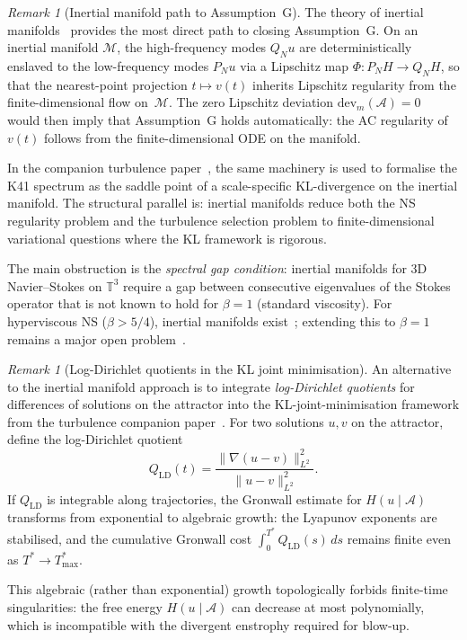 \documentclass[12pt,a4paper]{article}
\theoremstyle{definition}
\theoremstyle{plain}
\theoremstyle{remark}
\newtheorem{remark}[definition]{Remark}
\begin{document}
\begin{remark}[Inertial manifold path to Assumption~G]
\label{rem:inertial-manifold-path}
The theory of inertial manifolds~\cite{FoiasSellTemam88} provides the most
direct path to closing Assumption~G\@. On an inertial manifold
$\mathcal{M}$, the high-frequency modes $Q_N u$ are deterministically
enslaved to the low-frequency modes $P_N u$ via a Lipschitz map
$\Phi \colon P_N H \to Q_N H$, so that the nearest-point projection
$t \mapsto v(t)$ inherits Lipschitz regularity from the finite-dimensional
flow on~$\mathcal{M}$. The zero Lipschitz deviation
$\mathrm{dev}_m(\mathcal{A}) = 0$~\cite{BarbuCannone2016} would then
imply that Assumption~G holds automatically: the AC regularity of $v(t)$
follows from the finite-dimensional ODE on the manifold.

In the companion turbulence paper~\cite{FST-TU2026}, the same machinery
is used to formalise the K41 spectrum as the saddle point of a
scale-specific KL-divergence on the inertial manifold.
The structural parallel is: inertial manifolds reduce both the NS regularity
problem and the turbulence selection problem to finite-dimensional
variational questions where the KL framework is rigorous.

The main obstruction is the \emph{spectral gap condition}: inertial
manifolds for 3D Navier--Stokes on $\mathbb{T}^3$ require a gap between
consecutive eigenvalues of the Stokes operator that is not known to hold
for $\beta = 1$ (standard viscosity). For hyperviscous NS
($\beta > 5/4$), inertial manifolds
exist~\cite{EdenFoiasNicolaenko1994}; extending this to $\beta = 1$
remains a major open problem~\cite{Zelik2014}.
\end{remark}

\begin{remark}[Log-Dirichlet quotients in the KL joint minimisation]
\label{rem:log-dirichlet}
An alternative to the inertial manifold approach is to integrate
\emph{log-Dirichlet quotients} for differences of solutions on the
attractor into the KL-joint-minimisation framework from the turbulence
companion paper~\cite{FST-TU2026}. For two solutions $u, v$ on the
attractor, define the log-Dirichlet quotient
\[
  Q_{\mathrm{LD}}(t)
  = \frac{\|\nabla(u - v)\|_{L^2}^2}{\|u - v\|_{L^2}^2}.
\]
If $Q_{\mathrm{LD}}$ is integrable along trajectories, the Gronwall
estimate for $H(u \mid \mathcal{A})$ transforms from exponential to
algebraic growth: the Lyapunov exponents are stabilised, and the
cumulative Gronwall cost $\int_0^{T^*} Q_{\mathrm{LD}}(s)\, ds$
remains finite even as $T^* \to T^*_{\max}$.

This algebraic (rather than exponential) growth topologically forbids
finite-time singularities: the free energy $H(u \mid \mathcal{A})$
can decrease at most polynomially, which is incompatible with the
divergent enstrophy required for blow-up.
\end{remark}
\end{document}
